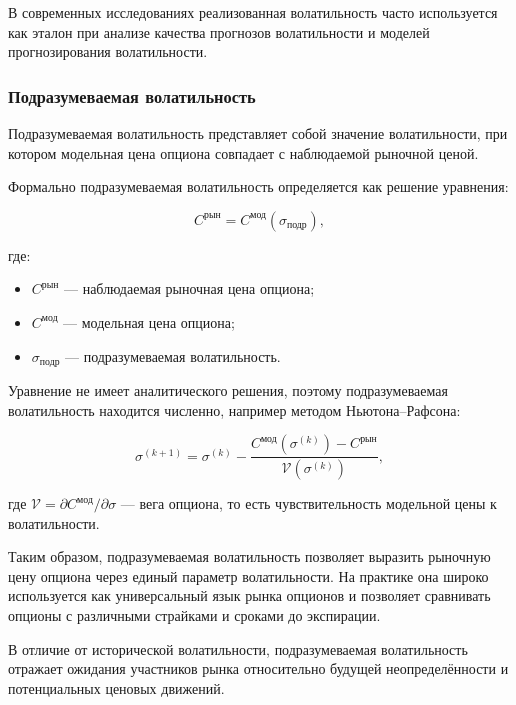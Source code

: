 \documentclass[11pt,a4paper]{article}
\begin{document}
В современных исследованиях реализованная волатильность часто используется как эталон при анализе качества прогнозов волатильности и моделей прогнозирования волатильности.

\subsubsection{Подразумеваемая волатильность}

Подразумеваемая волатильность представляет собой значение волатильности, при котором модельная цена опциона совпадает с наблюдаемой рыночной ценой.

Формально подразумеваемая волатильность определяется как решение уравнения:

\begin{equation}
C^{\text{рын}} = C^{\text{мод}}(\sigma_{\text{подр}}),
\end{equation}

где:
\begin{itemize}
    \item $C^{\text{рын}}$ --- наблюдаемая рыночная цена опциона;
    
    \item $C^{\text{мод}}$ --- модельная цена опциона;
    
    \item $\sigma_{\text{подр}}$ --- подразумеваемая волатильность.
\end{itemize}

Уравнение не имеет аналитического решения, поэтому подразумеваемая волатильность находится численно, например методом Ньютона--Рафсона:

\begin{equation}
\sigma^{(k+1)} = \sigma^{(k)} - \frac{C^{\text{мод}}(\sigma^{(k)}) - C^{\text{рын}}}{\mathcal{V}(\sigma^{(k)})},
\end{equation}

где $\mathcal{V} = \partial C^{\text{мод}}/\partial\sigma$ --- вега опциона, то есть чувствительность модельной цены к волатильности.

Таким образом, подразумеваемая волатильность позволяет выразить рыночную цену опциона через единый параметр волатильности. На практике она широко используется как универсальный язык рынка опционов и позволяет сравнивать опционы с различными страйками и сроками до экспирации.

В отличие от исторической волатильности, подразумеваемая волатильность отражает ожидания участников рынка относительно будущей неопределённости и потенциальных ценовых движений.
\end{document}
